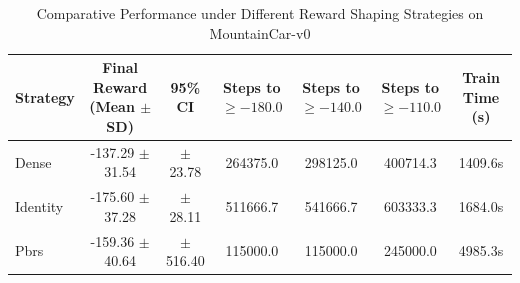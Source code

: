 \begin{table}[t]
\centering
\caption{Comparative Performance under Different Reward Shaping Strategies on MountainCar-v0}
\label{tab:reward_shaping_comparison}
\begin{tabular}{lcccccc}
\hline
\textbf{Strategy} & \textbf{Final Reward (Mean $\pm$ SD)} & \textbf{95\% CI} & \textbf{Steps to $\ge -180.0$} & \textbf{Steps to $\ge -140.0$} & \textbf{Steps to $\ge -110.0$} & \textbf{Train Time (s)} \\
\hline
Dense & -137.29 $\pm$ 31.54 & $\pm$ 23.78 & 264375.0 & 298125.0 & 400714.3 & 1409.6s \\
Identity & -175.60 $\pm$ 37.28 & $\pm$ 28.11 & 511666.7 & 541666.7 & 603333.3 & 1684.0s \\
Pbrs & -159.36 $\pm$ 40.64 & $\pm$ 516.40 & 115000.0 & 115000.0 & 245000.0 & 4985.3s \\
\hline
\end{tabular}
\end{table}
